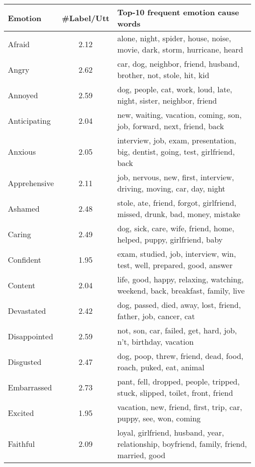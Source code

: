 \documentclass[11pt]{article}
\begin{document}
{\renewcommand{\arraystretch}{1}\begin{table*}[t!] \begin{center}
    \small
\begin{tabular}{lcl}
        \toprule
        \textbf{Emotion} & \textbf{\#Label/Utt} & \textbf{Top-10 frequent emotion cause words} \\
        \midrule
        Afraid        & 2.12 & alone, night, spider, house, noise, movie, dark, storm, hurricane, heard \\
        Angry         & 2.62 & car, dog, neighbor, friend, husband, brother, not, stole, hit, kid \\
        Annoyed       & 2.59 & dog, people, cat, work, loud, late, night, sister, neighbor, friend \\
        Anticipating  & 2.04 & new, waiting, vacation, coming, son, job, forward, next, friend, back \\
        Anxious       & 2.05 & interview, job, exam, presentation, big, dentist, going, test, girlfriend, back \\
        Apprehensive  & 2.11 & job, nervous, new, first, interview, driving, moving, car, day, night \\
        Ashamed       & 2.48 & stole, ate, friend, forgot, girlfriend, missed, drunk, bad, money, mistake \\
        Caring        & 2.49 & dog, sick, care, wife, friend, home, helped, puppy, girlfriend, baby \\
        Confident     & 1.95 & exam, studied, job, interview, win, test, well, prepared, good, answer \\
        Content       & 2.04 & life, good, happy, relaxing, watching, weekend, back, breakfast, family, live \\
        Devastated    & 2.42 & dog, passed, died, away, lost, friend, father, job, cancer, cat \\
        Disappointed  & 2.59 & not, son, car, failed, get, hard, job, n't, birthday, vacation \\
        Disgusted     & 2.47 & dog, poop, threw, friend, dead, food, roach, puked, eat, animal \\
        Embarrassed   & 2.73 & pant, fell, dropped, people, tripped, stuck, slipped, toilet, front, friend \\
        Excited       & 1.95 & vacation, new, friend, first, trip, car, puppy, see, won, coming \\
        Faithful      & 2.09 & loyal, girlfriend, husband, year, relationship, boyfriend, family, friend, married, good \\

\end{tabular}
\end{center}
\end{table*}}
\end{document}
